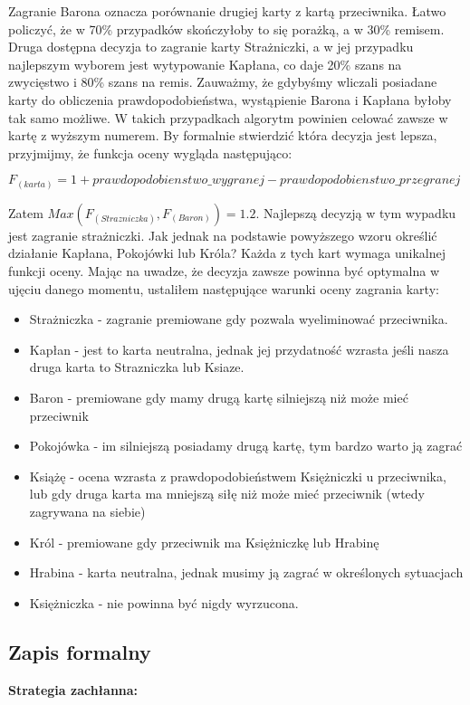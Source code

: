 Zagranie Barona oznacza porównanie drugiej karty z kartą przeciwnika. Łatwo policzyć, że w 70\% przypadków skończyłoby to się porażką, a w 30\% remisem. Druga dostępna decyzja to zagranie karty Strażniczki, a w jej przypadku najlepszym wyborem jest wytypowanie Kapłana, co daje 20\% szans na zwycięstwo i 80\% szans na remis. Zauważmy, że gdybyśmy wliczali posiadane karty do obliczenia prawdopodobieństwa, wystąpienie Barona i Kapłana byłoby tak samo możliwe. W takich przypadkach algorytm powinien celować zawsze w kartę z wyższym numerem. By formalnie stwierdzić która decyzja jest lepsza, przyjmijmy, że funkcja oceny wygląda następująco:

\begin{center}
	$F_{(karta)} = 1 + prawdopodobienstwo\_wygranej - prawdopodobienstwo\_przegranej$
\end{center}

Zatem $Max(F_{(Strazniczka)}, F_{(Baron)}) = 1.2$. Najlepszą decyzją w tym wypadku jest zagranie strażniczki. Jak jednak na podstawie powyższego wzoru określić działanie Kapłana, Pokojówki lub Króla? Każda z tych kart wymaga unikalnej funkcji oceny. Mając na uwadze, że decyzja zawsze powinna być optymalna w ujęciu danego momentu, ustaliłem następujące warunki oceny zagrania karty:
\begin{itemize}
	\item Strażniczka - zagranie premiowane gdy pozwala wyeliminować przeciwnika.
	\item Kapłan - jest to karta neutralna, jednak jej przydatność wzrasta jeśli nasza druga karta to Strazniczka lub Ksiaze.
	\item Baron - premiowane gdy mamy drugą kartę silniejszą niż może mieć przeciwnik
	\item Pokojówka - im silniejszą posiadamy drugą kartę, tym bardzo warto ją zagrać
	\item Książę - ocena wzrasta z prawdopodobieństwem Księżniczki u przeciwnika, lub gdy druga karta ma mniejszą siłę niż może mieć przeciwnik (wtedy zagrywana na siebie)
	\item Król - premiowane gdy przeciwnik ma Księżniczkę lub Hrabinę
	\item Hrabina - karta neutralna, jednak musimy ją zagrać w określonych sytuacjach
	\item Księżniczka - nie powinna być nigdy wyrzucona.
\end{itemize}

\subsection{Zapis formalny}
\textbf{Strategia zachłanna:}

